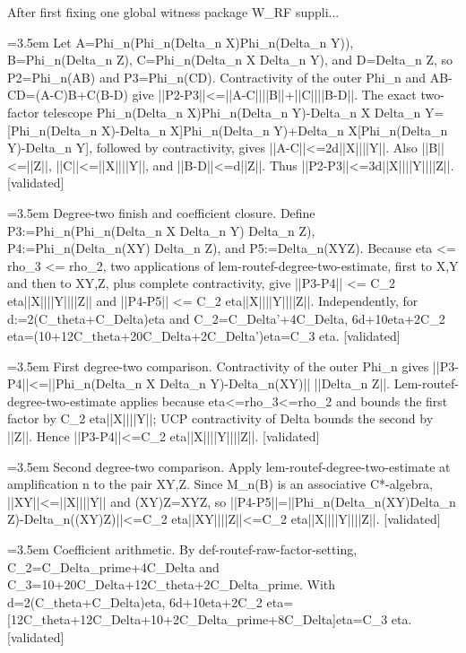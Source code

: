 \documentclass{article}
\newcommand{\step}[1]{\par\noindent\hangindent=3.5em\hangafter=1%
  \makebox[3.5em][l]{\textbf{#1.}}}
\newcommand{\steptag}[1]{\hfill{\small\textsf{[#1]}}}
\begin{document}
\begin{proofbox}{After first fixing one global witness package W\_RF suppli...}
\step{1.4.1} Let A=Phi\_n(Phi\_n(Delta\_n X)Phi\_n(Delta\_n Y)), B=Phi\_n(Delta\_n Z), C=Phi\_n(Delta\_n X Delta\_n Y), and D=Delta\_n Z, so P2=Phi\_n(AB) and P3=Phi\_n(CD). Contractivity of the outer Phi\_n and AB-CD=(A-C)B+C(B-D) give ||P2-P3||<=||A-C||||B||+||C||||B-D||. The exact two-factor telescope Phi\_n(Delta\_n X)Phi\_n(Delta\_n Y)-Delta\_n X Delta\_n Y=[Phi\_n(Delta\_n X)-Delta\_n X]Phi\_n(Delta\_n Y)+Delta\_n X[Phi\_n(Delta\_n Y)-Delta\_n Y], followed by contractivity, gives ||A-C||<=2d||X||||Y||. Also ||B||<=||Z||, ||C||<=||X||||Y||, and ||B-D||<=d||Z||. Thus ||P2-P3||<=3d||X||||Y||||Z||. \steptag{validated} \\[4pt]
\step{1.5} Degree-two finish and coefficient closure. Define P3:=Phi\_n(Phi\_n(Delta\_n X Delta\_n Y) Delta\_n Z), P4:=Phi\_n(Delta\_n(XY) Delta\_n Z), and P5:=Delta\_n(XYZ). Because eta <= rho\_3 <= rho\_2, two applications of lem-routef-degree-two-estimate, first to X,Y and then to XY,Z, plus complete contractivity, give ||P3-P4|| <= C\_2 eta||X||||Y||||Z|| and ||P4-P5|| <= C\_2 eta||X||||Y||||Z||. Independently, for d:=2(C\_theta+C\_Delta)eta and C\_2=C\_Delta'+4C\_Delta, 6d+10eta+2C\_2 eta=(10+12C\_theta+20C\_Delta+2C\_Delta')eta=C\_3 eta. \steptag{validated} \\[6pt]
\step{1.5.1} First degree-two comparison. Contractivity of the outer Phi\_n gives ||P3-P4||<=||Phi\_n(Delta\_n X Delta\_n Y)-Delta\_n(XY)|| ||Delta\_n Z||. Lem-routef-degree-two-estimate applies because eta<=rho\_3<=rho\_2 and bounds the first factor by C\_2 eta||X||||Y||; UCP contractivity of Delta bounds the second by ||Z||. Hence ||P3-P4||<=C\_2 eta||X||||Y||||Z||. \steptag{validated} \\[4pt]
\step{1.5.2} Second degree-two comparison. Apply lem-routef-degree-two-estimate at amplification n to the pair XY,Z. Since M\_n(B) is an associative C*-algebra, ||XY||<=||X||||Y|| and (XY)Z=XYZ, so ||P4-P5||=||Phi\_n(Delta\_n(XY)Delta\_n Z)-Delta\_n((XY)Z)||<=C\_2 eta||XY||||Z||<=C\_2 eta||X||||Y||||Z||. \steptag{validated} \\[4pt]
\step{1.5.3} Coefficient arithmetic. By def-routef-raw-factor-setting, C\_2=C\_Delta\_prime+4C\_Delta and C\_3=10+20C\_Delta+12C\_theta+2C\_Delta\_prime. With d=2(C\_theta+C\_Delta)eta, 6d+10eta+2C\_2 eta=[12C\_theta+12C\_Delta+10+2C\_Delta\_prime+8C\_Delta]eta=C\_3 eta. \steptag{validated} \\[4pt]
\end{proofbox}
\end{document}
